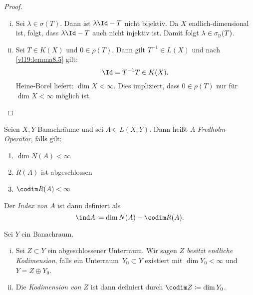 \begin{proof}
    \begin{enumerate}[(i)]
        \item
            Sei $\lambda\in\sigma(T)$. Dann ist $\lambda\Id-T$ nicht bijektiv.
            Da $X$ endlich-dimensional ist, folgt, dass $\lambda\Id-T$ auch
            nicht injektiv ist. Damit folgt $\lambda\in\sigma_{\mathrm p}(T)$.
            
        \item
            Sei $T\in K(X)$ und $0\in\rho(T)$. Dann gilt $T^{-1}\in L(X)$ und
            nach \cref{vl19:lemma8.5} gilt:
            \[ \Id = T^{-1} T \in K(X) . \]
            Heine-Borel  liefert: $\dim X < \infty$. Dies
            impliziert, dass $0\in\rho(T)$ nur für $\dim X < \infty$ möglich
            ist.
    \end{enumerate}
\end{proof}

\begin{thDef}
    Seien $X,Y$ Banachräume und sei $A\in L(X,Y)$. Dann heißt $A$
    \emph{Fredholm-Operator}, falls gilt:
    \begin{enumerate}[(1)]
        \item
            $\dim N(A) < \infty$
        \item
            $R(A)$ ist abgeschlossen
        \item
            $\codim R(A) < \infty$
    \end{enumerate}
    Der \emph{Index von $A$} ist dann definiert als
    \[ \ind A \defeq \dim N(A) - \codim R(A)  . \]
\end{thDef}

\begin{thDef}[Kodimension] \label{vl20:def:codim}
    Sei $Y$ ein Banachraum.
    \begin{enumerate}[(i)]
        \item
            Sei $Z\subset Y$ ein abgeschlossener Unterraum. Wir sagen
            \emph{$Z$ besitzt endliche Kodimension}, falls ein
            Unterraum~$Y_0\subset Y$ existiert mit $\dim Y_0 < \infty$ 
            und $Y = Z \oplus Y_0$.
            
        \item
            Die \emph{Kodimension von $Z$} ist dann definiert durch
            $\codim Z \defeq \dim Y_0$.
    \end{enumerate}
\end{thDef}

